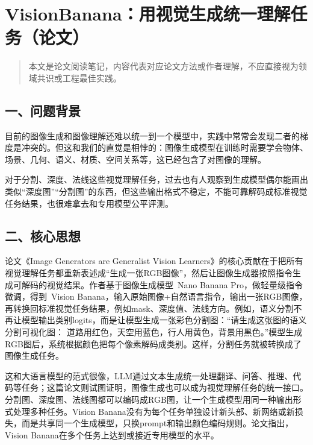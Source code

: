 \hypertarget{visionbananaux7528ux89c6ux89c9ux751fux6210ux7edfux4e00ux7406ux89e3ux4efbux52a1ux8bbaux6587}{%
\section{VisionBanana：用视觉生成统一理解任务（论文）}\label{visionbananaux7528ux89c6ux89c9ux751fux6210ux7edfux4e00ux7406ux89e3ux4efbux52a1ux8bbaux6587}}

\begin{quote}
本文是论文阅读笔记，内容代表对应论文方法或作者理解，不应直接视为领域共识或工程最佳实践。
\end{quote}

\hypertarget{ux4e00ux95eeux9898ux80ccux666f-14}{%
\subsection{一、问题背景}\label{ux4e00ux95eeux9898ux80ccux666f-14}}

目前的图像生成和图像理解还难以统一到一个模型中，实践中常常会发现二者的梯度是冲突的。但这和我们的直觉是相悖的：图像生成模型在训练时需要学会物体、场景、几何、语义、材质、空间关系等，这已经包含了对图像的理解。

对于分割、深度、法线这些视觉理解任务，过去也有人观察到生成模型偶尔能画出类似``深度图''``分割图''的东西，但这些输出格式不稳定，不能可靠解码成标准视觉任务结果，也很难拿去和专用模型公平评测。

\hypertarget{ux4e8cux6838ux5fc3ux601dux60f3-7}{%
\subsection{二、核心思想}\label{ux4e8cux6838ux5fc3ux601dux60f3-7}}

论文《Image Generators are Generalist Vision Learners》的核心贡献在于把所有视觉理解任务都重新表述成``生成一张RGB图像''，然后让图像生成器按照指令生成可解码的视觉结果。作者基于图像生成模型~Nano Banana Pro，做轻量级指令微调，得到~Vision Banana，输入原始图像+自然语言指令，输出一张RGB图像，再转换回标准视觉任务结果，例如mask、深度值、法线方向。例如，语义分割不再让模型输出类别logits，而是让模型生成一张彩色分割图：``请生成这张图的语义分割可视化图： 道路用红色，天空用蓝色，行人用黄色，背景用黑色。''模型生成RGB图后，系统根据颜色把每个像素解码成类别。这样，分割任务就被转换成了图像生成任务。

这和大语言模型的范式很像，LLM通过文本生成统一处理翻译、问答、推理、代码等任务；这篇论文则试图证明，图像生成也可以成为视觉理解任务的统一接口。分割图、深度图、法线图都可以编码成RGB图，让一个生成模型用同一种输出形式处理多种任务。Vision Banana没有为每个任务单独设计新头部、新网络或新损失，而是共享同一个生成模型，只换prompt和输出颜色编码规则。论文指出，Vision Banana在多个任务上达到或接近专用模型的水平。


